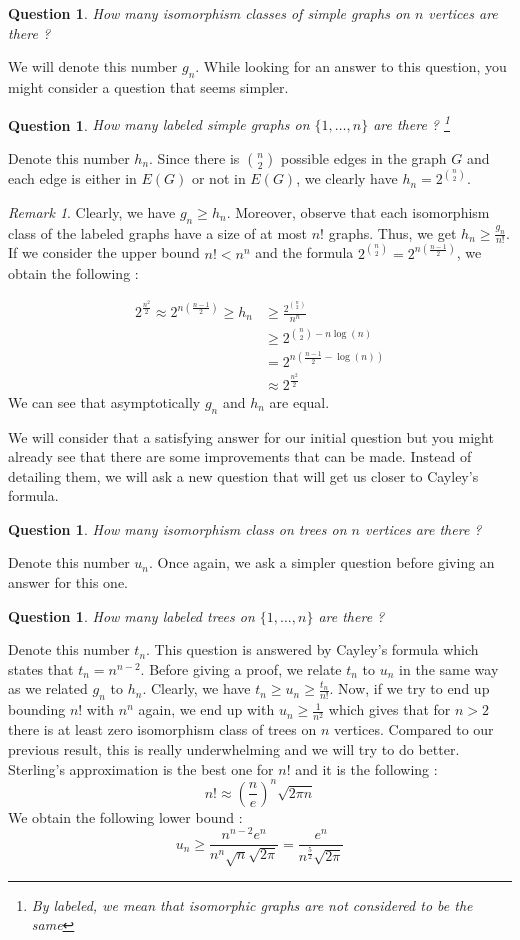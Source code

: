\documentclass{tufte-handout}
\newcommand{\bra}[1]{\left(#1\right)}
\newtheorem{quest}[thm]{Question}
\theoremstyle{definition}
\theoremstyle{remark}
\newtheorem{rem}[thm]{Remark}
\begin{document}
\begin{quest}
	How many isomorphism classes of simple graphs on $n$ vertices are there ?
\end{quest}
We will denote this number $g_n$. While looking for an answer to this question, you might consider a question that seems simpler.
\begin{quest}
	How many labeled simple graphs on $\{1,\dots, n\}$ are there ? \footnote{By labeled, we mean that isomorphic graphs are not considered to be the same}
\end{quest}
Denote this number $h_n$. Since there is $\binom{n}{2}$ possible edges in the graph $G$ and each edge is either in $E(G)$ or not in $E(G)$, we clearly have $h_n = 2^{\binom{n}{2}}$.
\begin{rem}
	Clearly, we have $g_n \geq h_n$. Moreover, observe that each isomorphism class of the labeled graphs have a size of at most $n!$ graphs. Thus, we get $h_n \geq \frac{g_n}{n!}$. If we consider the upper bound $n! < n^n$ and the formula $2^{\binom{n}{2}} = 2^{n\bra{\frac{n-1}{2}}}$, we obtain the following :
	
	\begin{align*}
		2^{\frac{n^2}{2}} \approx 2^{n\bra{\frac{n-1}{2}}} \geq h_n &\geq \frac{2^{\binom{n}{2}}}{n^n} \\
		&\geq 2^{\binom{n}{2} - n\log(n)}\\
		&= 2^{n\bra{\frac{n-1}{2}-\log(n)}}\\
		&\approx 2^{\frac{n^2}{2}}
	\end{align*}
	We can see that asymptotically $g_n$ and $h_n$ are equal. 
\end{rem}
We will consider that a satisfying answer for our initial question but you might already see that there are some improvements that can be made. Instead of detailing them, we will ask a new question that will get us closer to Cayley's formula.
\begin{quest}
	How many isomorphism class on trees on $n$ vertices are there ?
\end{quest}
Denote this number $u_n$. Once again, we ask a simpler question before giving an answer for this one.
\begin{quest}
	How many labeled trees on $\{1,\dots, n\}$ are there ?
\end{quest}
Denote this number $t_n$. This question is answered by Cayley's formula which states that $t_n = n^{n-2}$. Before giving a proof, we relate $t_n$ to $u_n$ in the same way as we related $g_n$ to $h_n$. Clearly, we have $t_n \geq u_n \geq \frac{t_n}{n!}$. Now, if we try to end up bounding $n!$ with $n^n$ again, we end up with $u_n \geq \frac{1}{n^2}$ which gives that for $n > 2$ there is at least zero isomorphism class of trees on $n$ vertices. Compared to our previous result, this is really underwhelming and we will try to do better. Sterling's approximation is the best one for $n!$ and it is the following :
$$ n! \approx \bra{\frac{n}{e}}^n\sqrt{2\pi n}$$
We obtain the following lower bound :
$$ u_n \geq \frac{n^{n-2}e^n}{n^n\sqrt{n}\sqrt{2\pi}} = \frac{e^n}{n^{\frac{5}{2}}\sqrt{2\pi}}$$ 
\end{document}
